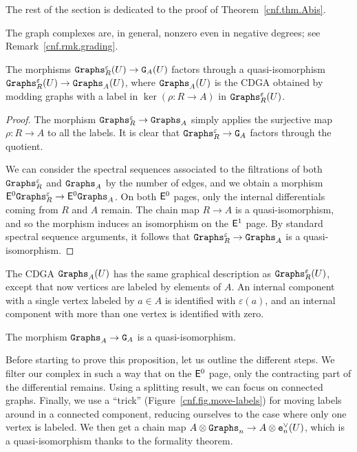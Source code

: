 The rest of the section is dedicated to the proof of Theorem~\ref{cnf.thm.Abis}.

\begin{remark}
  The graph complexes are, in general, nonzero even in negative degrees; see Remark~\ref{cnf.rmk.grading}.
\end{remark}

\begin{lemma}
  \label{cnf.lemma.graph-r-graph-A}
  The morphisms $\mathtt{Graphs}^{\varepsilon}_{R}(U) \to \mathtt{G}_{A}(U)$ factors through a quasi-iso\-mor\-phism $\mathtt{Graphs}^{\varepsilon}_{R}(U) \to \mathtt{Graphs}_{A}(U)$, where $\mathtt{Graphs}_{A}(U)$ is the CDGA obtained by modding graphs with a label in $\ker(\rho : R \to A)$ in $\mathtt{Graphs}^{\varepsilon}_{R}(U)$.
\end{lemma}

\begin{proof}
  The morphism $\mathtt{Graphs}^{\varepsilon}_{R} \to \mathtt{Graphs}_{A}$ simply applies the surjective map $\rho : R \to A$ to all the labels.
  It is clear that $\mathtt{Graphs}^{\varepsilon}_{R} \to \mathtt{G}_{A}$ factors through the quotient.

  We can consider the spectral sequences associated to the filtrations of both $\mathtt{Graphs}^{\varepsilon}_{R}$ and $\mathtt{Graphs}_{A}$ by the number of edges, and we obtain a morphism $\mathsf{E}^{0} \mathtt{Graphs}^{\varepsilon}_{R} \to \mathsf{E}^{0} \mathtt{Graphs}_{A}$.
  On both $\mathsf{E}^{0}$ pages, only the internal differentials coming from $R$ and $A$ remain.
  The chain map $R \to A$ is a quasi-isomorphism, and so the morphism induces an isomorphism on the $\mathsf{E}^{1}$ page.
  By standard spectral sequence arguments, it follows that $\mathtt{Graphs}^{\varepsilon}_{R} \to \mathtt{Graphs}_{A}$ is a quasi-isomorphism.
\end{proof}

The CDGA $\mathtt{Graphs}_{A}(U)$ has the same graphical description as $\mathtt{Graphs}^{\varepsilon}_{R}(U)$, except that now vertices are labeled by elements of $A$.
An internal component with a single vertex labeled by $a \in A$ is identified with $\varepsilon(a)$, and an internal component with more than one vertex is identified with zero.

\begin{proposition}
  \label{cnf.prop.graph-A-G-A}
  The morphism $\mathtt{Graphs}_{A} \to \mathtt{G}_{A}$ is a quasi-isomorphism.
\end{proposition}

Before starting to prove this proposition, let us outline the different steps.
We filter our complex in such a way that on the $\mathsf{E}^{0}$ page, only the contracting part of the differential remains.
Using a splitting result, we can focus on connected graphs.
Finally, we use a ``trick'' (Figure~\ref{cnf.fig.move-labels}) for moving labels around in a connected component, reducing ourselves to the case where only one vertex is labeled.
We then get a chain map $A \otimes \mathtt{Graphs}_{n} \to A \otimes \mathtt{e}_{n}^{\vee}(U)$, which is a quasi-isomorphism thanks to the formality theorem.

